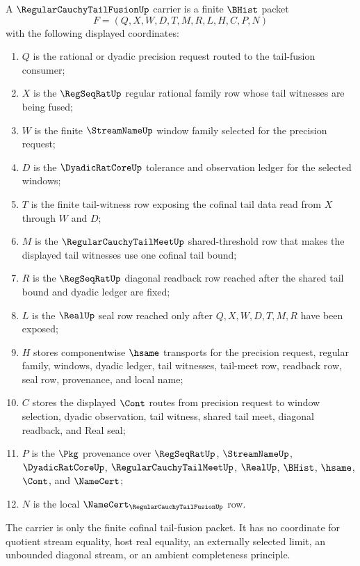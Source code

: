 \begin{definition}
\label{def:regular-cauchy-tail-fusion-carrier}
A $\RegularCauchyTailFusionUp$ carrier is a finite $\BHist$ packet
$$
F=(Q,X,W,D,T,M,R,L,H,C,P,N)
$$
with the following displayed coordinates:
\begin{enumerate}
\item $Q$ is the rational or dyadic precision request routed to the tail-fusion consumer;
\item $X$ is the $\RegSeqRatUp$ regular rational family row whose tail witnesses are being fused;
\item $W$ is the finite $\StreamNameUp$ window family selected for the precision request;
\item $D$ is the $\DyadicRatCoreUp$ tolerance and observation ledger for the selected windows;
\item $T$ is the finite tail-witness row exposing the cofinal tail data read from $X$ through $W$ and $D$;
\item $M$ is the $\RegularCauchyTailMeetUp$ shared-threshold row that makes the displayed tail witnesses use one cofinal tail bound;
\item $R$ is the $\RegSeqRatUp$ diagonal readback row reached after the shared tail bound and dyadic ledger are fixed;
\item $L$ is the $\RealUp$ seal row reached only after $Q,X,W,D,T,M,R$ have been exposed;
\item $H$ stores componentwise $\hsame$ transports for the precision request, regular family, windows, dyadic ledger, tail witnesses, tail-meet row, readback row, seal row, provenance, and local name;
\item $C$ stores the displayed $\Cont$ routes from precision request to window selection, dyadic observation, tail witness, shared tail meet, diagonal readback, and Real seal;
\item $P$ is the $\Pkg$ provenance over $\RegSeqRatUp$, $\StreamNameUp$, $\DyadicRatCoreUp$, $\RegularCauchyTailMeetUp$, $\RealUp$, $\BHist$, $\hsame$, $\Cont$, and $\NameCert$;
\item $N$ is the local $\NameCert_{\RegularCauchyTailFusionUp}$ row.
\end{enumerate}
The carrier is only the finite cofinal tail-fusion packet. It has no coordinate for quotient stream equality, host real equality, an externally selected limit, an unbounded diagonal stream, or an ambient completeness principle.
\end{definition}

